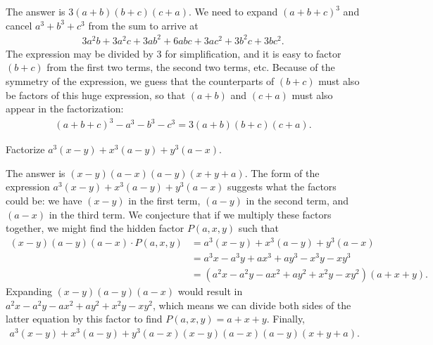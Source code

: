 \documentclass[12pt,a4paper]{memoir}
\theoremstyle{definition}
\begin{document}
	\begin{solution}
		The answer is $3(a+b)(b+c)(c+a)$. We need to expand $(a+b+c)^3$ and cancel $a^3+b^3+c^3$ from the sum to arrive at
		\begin{align*}
			3 a^2 b + 3 a^2 c + 3 a b^2 + 6 a b c + 3 a c^2 + 3 b^2 c + 3 b c^2.
		\end{align*}
		The expression may be divided by $3$ for simplification, and it is easy to factor $(b+c)$ from the first two terms, the second two terms, etc. Because of the symmetry of the expression, we guess that the counterparts of $(b+c)$ must also be factors of this huge expression, so that $(a+b)$ and $(c+a)$ must also appear in the factorization:
		\begin{align*}
			(a+b+c)^3 - a^3 - b^3 - c^3 = 3(a+b)(b+c)(c+a).
		\end{align*}
	\end{solution}
	
	
%	
\setcounter{question}{85}

	\begin{tcolorbox}
		\begin{question}
			Factorize $a^3(x-y) + x^3(a-y) + y^3(a-x)$.
		\end{question}
	\end{tcolorbox}
	
	\begin{solution}
		The answer is $(x-y)(a-x)(a-y)(x+y+a)$. The form of the expression $a^3(x-y) + x^3(a-y) + y^3(a-x)$ suggests what the factors could be: we have $(x-y)$ in the first term, $(a-y)$ in the second term, and $(a-x)$ in the third term. We conjecture that if we multiply these factors together, we might find the hidden factor $P(a,x,y)$ such that
		\begin{align*}
			(x-y)(a-y)(a-x)\cdot P(a,x,y) &= a^3 (x-y) + x^3 (a-y) + y^3 (a-x)\\
			& =  a^3 x - a^3 y + a x^3 + a y^3 - x^3 y - x y^3\\
			& = (a^2 x - a^2 y - a x^2 + a y^2 + x^2 y - x y^2)(a+x+y). 
		\end{align*}
		Expanding $(x-y)(a-y)(a-x)$ would result in $a^2 x - a^2 y - a x^2 + a y^2 + x^2 y - x y^2$, which means we can divide both sides of the latter equation by this factor to find $P(a,x,y)=a+x+y$.  Finally,
		\begin{align*}
			a^3(x-y) + x^3(a-y) + y^3(a-x)(x-y)(a-x)(a-y)(x+y+a).
		\end{align*}
		
	\end{solution}
	
\end{document}
